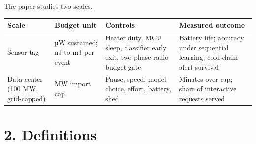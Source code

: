 \documentclass[10pt,letterpaper]{article}
\newcounter{none}
\begin{document}
The paper studies two scales.

{\def\LTcaptype{none} %
{\footnotesize\setlength{\tabcolsep}{3.8pt}\renewcommand{\arraystretch}{1.15}
\begin{longtable}[]{@{}
  >{\raggedright\arraybackslash}p{}
  >{\raggedright\arraybackslash}p{}
  >{\raggedright\arraybackslash}p{}
  >{\raggedright\arraybackslash}p{}@{}}
\toprule\noalign{}
\begin{minipage}[b]{\linewidth}\raggedright
\textbf{Scale}
\end{minipage} & \begin{minipage}[b]{\linewidth}\raggedright
\textbf{Budget unit}
\end{minipage} & \begin{minipage}[b]{\linewidth}\raggedright
\textbf{Controls}
\end{minipage} & \begin{minipage}[b]{\linewidth}\raggedright
\textbf{Measured outcome}
\end{minipage} \\
\midrule\noalign{}
\endhead
\bottomrule\noalign{}
\endlastfoot
Sensor tag & µW sustained; nJ to mJ per event & Heater duty, MCU sleep,
classifier early exit, two-phase radio budget gate & Battery life;
accuracy under sequential learning; cold-chain alert survival \\
Data center (100 MW, grid-capped) & MW import cap & Pause, speed, model
choice, effort, battery, shed & Minutes over cap; share of interactive
requests served \\
\end{longtable}
}
}

\section{2. Definitions}\label{definitions}
\end{document}
